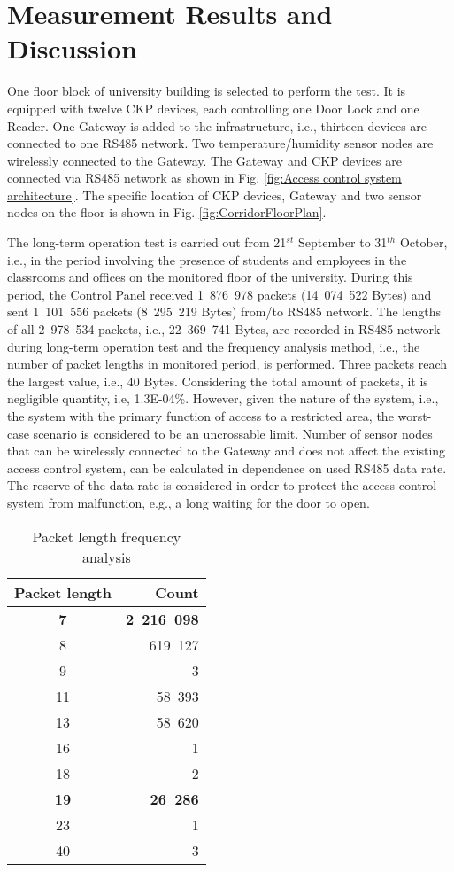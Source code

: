 \chapter{Measurement Results and Discussion}
One floor block of university building is selected to perform the test. It is equipped with twelve CKP devices, each controlling one Door Lock and one Reader. One Gateway is added to the infrastructure, i.e., thirteen devices are connected to one RS485 network. Two temperature/humidity sensor nodes are wirelessly connected to the Gateway. The Gateway and CKP devices are connected via RS485 network as shown in Fig. \ref{fig:Access control system architecture}. The specific location of CKP devices, Gateway and two sensor nodes on the floor is shown in Fig. \ref{fig:CorridorFloorPlan}.


The long-term operation test is carried out from 21$^{st}$ September to 31$^{th}$ October, i.e., in the period involving the presence of students and employees in the classrooms and offices on the monitored floor of the university.
During this period, the Control Panel received 1~876~978 packets (14~074~522 Bytes) and sent 1~101~556 packets (8~295~219 Bytes) from/to RS485 network. 
The lengths of all 2~978~534 packets, i.e., 22~369~741 Bytes, are recorded in RS485 network during long-term operation test and the frequency analysis  method, i.e., the number of packet lengths in monitored period, is performed. Three packets reach the largest value, i.e., 40 Bytes. 
Considering the total amount of packets, it is negligible quantity, i.e, 1.3E-04\%. However, given the nature of the system, i.e., the system with the primary function of access to a restricted area, the worst-case scenario is considered to be an uncrossable limit. 
Number of sensor nodes that can be wirelessly connected to the Gateway and does not affect the existing access control system, can be calculated in dependence on used RS485 data rate. The reserve of the data rate is considered in order to protect the access control system from malfunction, e.g., a long waiting for the door to open.

\begin{table}[h]
\centering
\footnotesize
\caption{Packet length frequency analysis}
\begin{tabular}{cr}
Packet length &  Count \\ \hline
\textbf{7}  &  \textbf{2~216~098}  \\
8  &   619~127   \\
9  &         3   \\
11 &    58~393   \\
13 &    58~620   \\
16 &         1   \\
18 &         2   \\
\textbf{19} &    \textbf{26~286}   \\
23 &         1   \\
40 &         3   \\
\end{tabular}
\label{tab:FreqAnalysis}
\end{table}


